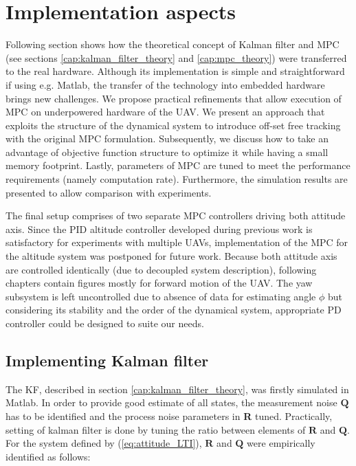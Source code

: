 \section{Implementation aspects}
\label{cap:Implementation}

Following section shows how the theoretical concept of Kalman filter and MPC (see sections \ref{cap:kalman_filter_theory} and \ref{cap:mpc_theory}) were transferred to the real hardware. Although its implementation is simple and straightforward if using e.g. Matlab, the transfer of the technology into embedded hardware brings new challenges. We propose practical refinements that allow execution of MPC on underpowered hardware of the UAV. We present an approach that exploits the structure of the dynamical system to introduce off-set free tracking with the original MPC formulation. Subsequently, we discuss how to take an advantage of objective function structure to optimize it while having a small memory footprint. Lastly, parameters of MPC are tuned to meet the performance requirements (namely computation rate). Furthermore, the simulation results are presented to allow comparison with experiments.

The final setup comprises of two separate MPC controllers driving both attitude axis. Since the PID altitude controller developed during previous work \citep{endrych2014} is satisfactory for experiments with multiple UAVs, implementation of the MPC for the altitude system was postponed for future work. Because both attitude axis are controlled identically (due to decoupled system description), following chapters contain figures mostly for forward motion of the UAV. The yaw subsystem is left uncontrolled due to absence of data for estimating angle $\phi$ but considering its stability and the order of the dynamical system, appropriate PD controller could be designed to suite our needs.

\subsection{Implementing Kalman filter}

The KF, described in section \ref{cap:kalman_filter_theory}, was firstly simulated in Matlab. In order to provide good estimate of all states, the measurement noise $\textbf{Q}$ has to be identified and the process noise parameters in \textbf{R} tuned. Practically, setting of kalman filter is done by tuning the ratio between elements of $\textbf{R}$ and $\textbf{Q}$. For the system defined by (\ref{eq:attitude_LTI}), $\textbf{R}$ and $\textbf{Q}$ were empirically identified as follows:

